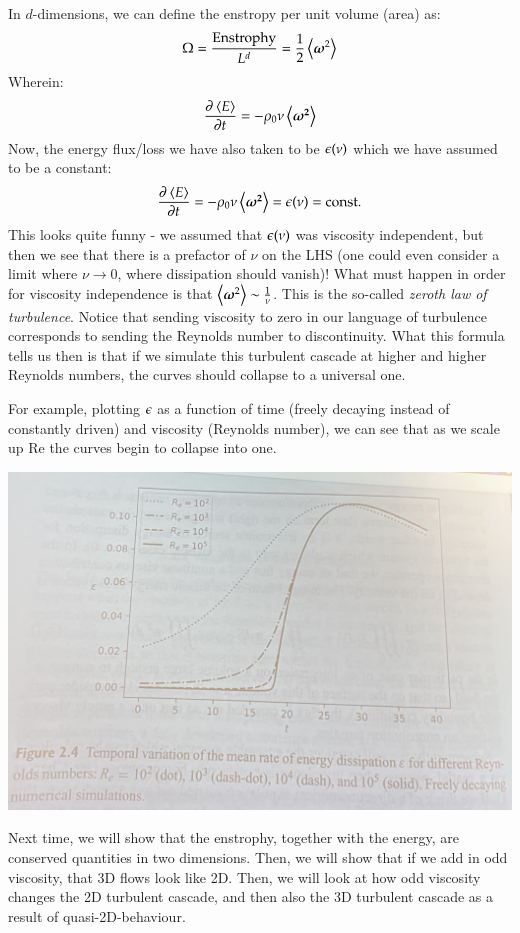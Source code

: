 In $d$-dimensions, we can define the enstropy per unit volume (area) as:
\begin{equation}
    \Omega = \frac{\text{Enstrophy}}{L^d} = \frac{1}{2}\left< \mbox{\boldmath$ \omega $}^2 \right>
\end{equation}
Wherein:
\begin{equation}
    \dpd{\avg{E}}{t} = -\rho_0 \nu \avg{\gv{\omega^2}}
\end{equation}
Now, the energy flux/loss we have also taken to be $\epsilon(\nu)$ which we have assumed to be a constant:
\begin{equation}
    \dpd{\avg{E}}{t} = -\rho_0 \nu \avg{\gv{\omega^2}} = \e(\nu) = \text{const.}
\end{equation}
This looks quite funny - we assumed that $\epsilon(\nu)$ was viscosity independent, but then we see that there is a prefactor of $\nu$ on the LHS (one could even consider a limit where $\nu \to 0$, where dissipation should vanish)! What must happen in order for viscosity independence is that $\left< \mbox{\boldmath$ \omega $}^2 \right> \sim \frac{1}{\nu}$. This is the so-called \emph{zeroth law of turbulence}. Notice that sending viscosity to zero in our language of turbulence corresponds to sending the Reynolds number to discontinuity. What this formula tells us then is that if we simulate this turbulent cascade at higher and higher Reynolds numbers, the curves should collapse to a universal one. 

For example, plotting $\epsilon$ as a function of time (freely decaying instead of constantly driven) and viscosity (Reynolds number), we can see that as we scale up $\text{Re}$ the curves begin to collapse into one.

\begin{center}
    \includegraphics[scale=0.2]{Lectures/Images/lec13-eRecurves.png}
\end{center}

Next time, we will show that the enstrophy, together with the energy, are conserved quantities in two dimensions. Then, we will show that if we add in odd viscosity, that 3D flows look like 2D. Then, we will look at how odd viscosity changes the 2D turbulent cascade, and then also the 3D turbulent cascade as a result of quasi-2D-behaviour.